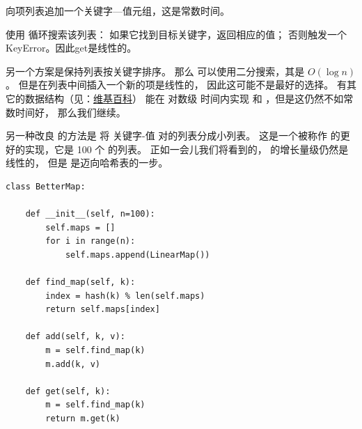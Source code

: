 
 向项列表追加一个关键字---值元组，这是常数时间。



 使用  循环搜索该列表： 如果它找到目标关键字，返回相应的值；
否则触发一个KeyError。因此get是线性的。


另一个方案是保持列表按关键字排序。
那么  可以使用二分搜索，其是 $O(\log n)$ 。
但是在列表中间插入一个新的项是线性的， 因此这可能不是最好的选择。
有其它的数据结构（见：\href{http://en.wikipedia.org/wiki/Red-black_tree}{维基百科}）
能在 对数级 时间内实现  和 ，但是这仍然不如常数时间好，
那么我们继续。





另一种改良  的方法是 将 关键字-值 对的列表分成小列表。
这是一个被称作  的更好的实现，它是 100 个  的列表。
正如一会儿我们将看到的， 的增长量级仍然是线性的，
但是  是迈向哈希表的一步。

\begin{lstlisting}
class BetterMap:

    def __init__(self, n=100):
        self.maps = []
        for i in range(n):
            self.maps.append(LinearMap())

    def find_map(self, k):
        index = hash(k) % len(self.maps)
        return self.maps[index]

    def add(self, k, v):
        m = self.find_map(k)
        m.add(k, v)

    def get(self, k):
        m = self.find_map(k)
        return m.get(k)
\end{lstlisting}

